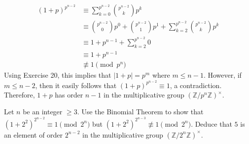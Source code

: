 \begin{solution}
\begin{align*}
        (1+p)^{p^{n-2}} &\equiv \sum_{k=0}^{p^{n-2}}\binom{p^{n-2}}{k}p^k \\
        &\equiv \binom{p^{n-2}}{0}p^0 + \binom{p^{n-2}}{1}p^1 
        + \sum_{k=2}^{p^{n-2}}\binom{p^{n-2}}{k}p^k \\
        &\equiv 1 + p^{n-1} + \sum_{k=2}^{p^{n-2}}0 \\
        &\equiv 1 + p^{n-1} \\
        &\not\equiv 1 \pmod{p^n}
    \end{align*}
    Using Exercise 20, this implies that $|1+p| = p^m$ where $m \leq n-1$. However, if $m \leq n-2$, then it easily follows that $(1+p)^{p^{n-2}} \equiv 1$, a contradiction. Therefore, $1+p$ has order $n-1$ in the multiplicative group $(\mathbb{Z}/p^n\mathbb{Z})^{\times}$.\\
\end{solution}

\begin{exercise}
    Let $n$ be an integer $\geq 3$. Use the Binomial Theorem to show that $(1+2^2)^{2^{n-2}} \equiv 1 \pmod{2^n}$ but $(1+2^2)^{2^{n-3}} \not\equiv 1 \pmod{2^n}$. Deduce that $5$ is an element of order $2^{n-2}$ in the multiplicative group $(\mathbb{Z}/2^n\mathbb{Z})^{\times}$.\\
\end{exercise}

